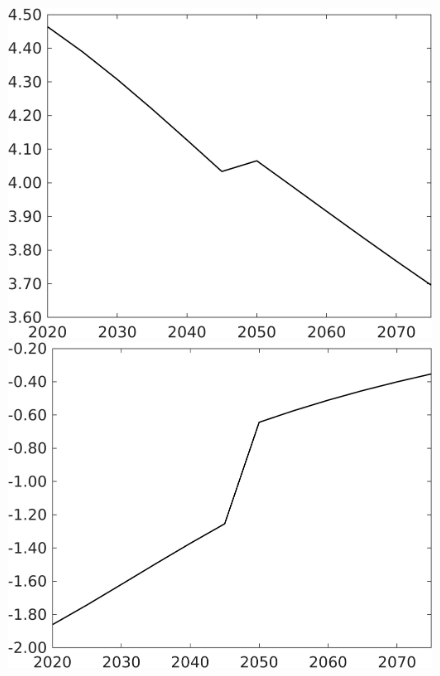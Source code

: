 \documentclass[12pt]{article}
\begin{document}
\begin{figure}[h!!]
\begin{minipage}[]{0.32\textwidth}
	\end{minipage}		
	\begin{minipage}[]{0.32\textwidth}
		\includegraphics[width=1\textwidth]{../../codding_model/own_basedOnFried/optimalPol_010922_revision/figures/all_13Sept22/CompTaufPER_bytaul_Equlab_Reg0_sff_spillover0_nsk0_xgr0_knspil1_sep1_LFlimit1_emsbase0_countec0_GovRev0_etaa0.79_lgd0.png}
	\end{minipage}		
	\begin{minipage}[]{0.32\textwidth}
		\includegraphics[width=1\textwidth]{../../codding_model/own_basedOnFried/optimalPol_010922_revision/figures/all_13Sept22/CompTaufPER_bytaul_Equlab_Reg0_sg_spillover0_nsk0_xgr0_knspil1_sep1_LFlimit1_emsbase0_countec0_GovRev0_etaa0.79_lgd0.png}

\end{minipage}
\end{figure}
\end{document}
